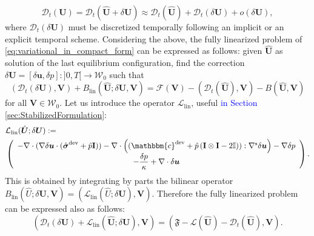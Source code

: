 \documentclass[11pt,english]{article}
\newcommand{\LM}[1]{\textcolor{blue}{#1}}
\def\disp{\boldsymbol{u}}
\def\stress{\boldsymbol{\sigma}}
\def\Identity{\mathbf{I}}
\def\SpaceTotal{\boldsymbol{\mathcal{W}}}
\def\TestFunctions{\boldsymbol{V}}
\def\UnkVariables{\boldsymbol{U}}
\def\DerB{B_{\text{lin}}}
\def\DerL{\mathcal{L}_{\text{lin}}}
\begin{document}
$$\mathcal{D}_t(\UnkVariables)=\mathcal{D}_t(\hat{\UnkVariables} + \delta \UnkVariables )\approx \mathcal{D}_t(\hat{\UnkVariables}) + \mathcal{D}_t\left(\delta \UnkVariables\right) + o(\delta \UnkVariables),$$ where $\mathcal{D}_t\left(\delta \UnkVariables\right)$
must be discretized temporally following an implicit or an explicit temporal scheme.
Considering the above, the fully linearized problem of \eqref{eq:variational_in_compact_form} can be expressed as follows: given  $\hat{\UnkVariables}$ as solution of the last equilibrium configuration, find the correction $\delta \UnkVariables=[\delta \disp, \delta p]:]0,T[\longrightarrow\SpaceTotal_0$ such that
    \begin{equation}
        \left(\mathcal{D}_t\left( \delta \UnkVariables \right),\TestFunctions \right )+ \DerB (\hat{\UnkVariables};\delta \UnkVariables,\TestFunctions) = \mathcal{F}\left(\TestFunctions\right)-(\mathcal{D}_t(\hat{\UnkVariables}),\TestFunctions ) -B(\hat{\UnkVariables},\TestFunctions)   \label{eq:variational_in_compact_form_linearized}
    \end{equation}
      for all $\TestFunctions \in \SpaceTotal_0$. Let us introduce the operator $\DerL$, useful \LM{in Section \ref{sec:StabilizedFormulation}}: 
    \begin{align}
        &\DerL(\hat{\UnkVariables};\delta\UnkVariables):=\nonumber\\
        &\left(\begin{array}{c}
        -\nabla \cdot (\nabla \delta \disp \cdot ( \hat{\stress}^{\text{dev}}+\hat{p}\Identity ))-\nabla \cdot \left( (\mathbbm{c}^{\text{dev}}+\hat{p}\left( \Identity \otimes \Identity -2\mathbb{I})\right):\nabla^{\rm{s}} \delta \disp\right) - \nabla \delta p \\
         -\dfrac{\delta p}{\kappa}+\nabla \cdot \delta \disp
        \end{array}\right).\label{eq:Lin_operator}
    \end{align}
This is obtained by integrating by parts the bilinear operator $\DerB(\hat{U};\delta \UnkVariables,\TestFunctions)=(\DerL(\hat{U};\delta \UnkVariables),\TestFunctions)$. Therefore the fully linearized problem can be expressed also as follows:
   \begin{equation*}
        (\mathcal{D}_t\left( \delta \UnkVariables \right)+ \DerL(\hat{\UnkVariables};\delta \UnkVariables),\TestFunctions) = (\mathfrak{F}-\mathcal{L}(\hat{\UnkVariables}) -\mathcal{D}_t(\hat{\UnkVariables}),\TestFunctions).
    \end{equation*}
    
\end{document}
